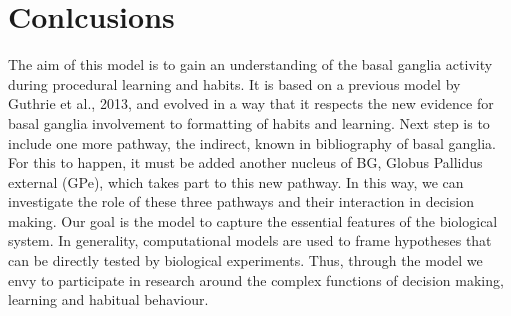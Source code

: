 \section{Conlcusions}

	The aim of this model is to gain an understanding of the basal ganglia activity during procedural learning and habits. It is based on a previous model by Guthrie et al., 2013, and evolved in a way that it respects the new evidence for basal ganglia involvement to formatting of habits and learning. Next step is to include one more pathway, the indirect, known in bibliography of basal ganglia. For this to happen, it must be added another nucleus of BG, Globus Pallidus external (GPe), which takes part to this new pathway. In this way, we can investigate the role of these three pathways and their interaction in decision making. Our goal is the model to capture the essential features of the biological system. In generality, computational models are used to frame hypotheses that can be directly tested by biological experiments. Thus, through the model we envy to participate in research around the complex functions of decision making, learning and habitual behaviour.
